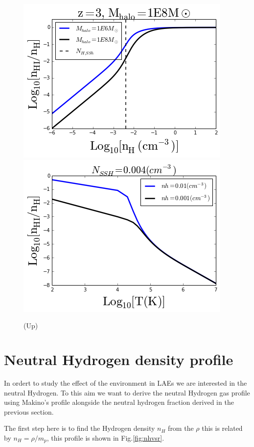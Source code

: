\documentclass[12pt]{article}
\begin{document}
\begin{figure}[H]\label{fig:eta}
\centering
\includegraphics[scale=0.7]{../code/etavsnh.png}
\includegraphics[scale=0.7]{../code/etavsT.png}
\caption{(Up) }
\end{figure}

\section{Neutral Hydrogen density profile}

In ordert to study the effect of the environment in LAEs we are interested in the neutral Hydrogen. 
To this aim we want to derive the neutral Hydrogen gas profile using Makino's profile alongside 
the neutral hydrogen fraction derived in the previous section. 

The first step here is to find the Hydrogen density $n_H$ from the $\rho$ this is related by $n_H = \rho / m_p$, 
this profile is shown in Fig.\ref{fig:nhvsr}.
\end{document}
